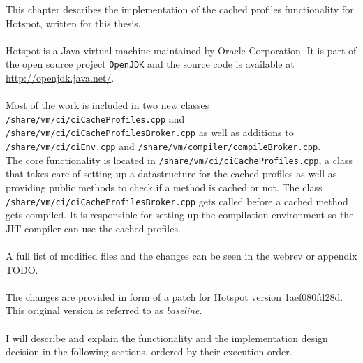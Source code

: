 This chapter describes the implementation of the cached profiles functionality for Hotspot, written for this thesis.
\\\\
Hotspot is a Java virtual machine maintained by Oracle Corporation. It is part of the open source project \texttt{OpenJDK} and the source code is available at \url{http://openjdk.java.net/}.
\\\\
Most of the work is included in two new classes \texttt{/share/vm/ci/ciCacheProfiles.cpp} and \\\texttt{/share/vm/ci/ciCacheProfilesBroker.cpp} as well as additions to \texttt{/share/vm/ci/ciEnv.cpp} and \texttt{/share/vm/compiler/compileBroker.cpp}.
\\
The core functionality is located in \texttt{/share/vm/ci/ciCacheProfiles.cpp}, a class that takes care of setting up a datastructure for the cached profiles as well as providing public methods to check if a method is cached or not. The class \texttt{/share/vm/ci/ciCacheProfilesBroker.cpp} gets called before a cached method gets compiled. It is responsible for setting up the compilation environment so the JIT compiler can use the cached profiles.
\\\\
A full list of modified files and the changes can be seen in the webrev or appendix TODO.
\\\\
The changes are provided in form of a patch for Hotspot version 1aef080fd28d. This original version is referred to as \textit{baseline}.
\\\\
I will describe and explain the functionality and the implementation design decision in the following sections, ordered by their execution order.

